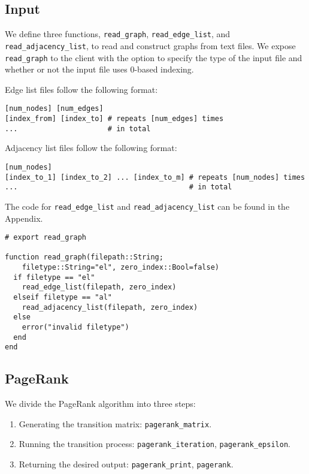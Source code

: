 \documentclass[12pt, titlepage, twoside]{amsart}
\begin{document}
\subsection{Input}

We define three functions,
\texttt{read_graph}, \texttt{read_edge_list}, and \texttt{read_adjacency_list},
to read and construct graphs from text files.
We expose \texttt{read_graph} to the client with the option to specify the type of the input file and
whether or not the input file uses 0-based indexing.

Edge list files follow the following format:

\begin{verbatim}
[num_nodes] [num_edges]
[index_from] [index_to] # repeats [num_edges] times
...                     # in total
\end{verbatim}

Adjacency list files follow the following format:

\begin{verbatim}
[num_nodes]
[index_to_1] [index_to_2] ... [index_to_m] # repeats [num_nodes] times
...                                        # in total
\end{verbatim}

The code for \texttt{read_edge_list} and \texttt{read_adjacency_list} can be found in the
Appendix.

\begin{verbatim}
# export read_graph

function read_graph(filepath::String;
    filetype::String="el", zero_index::Bool=false)
  if filetype == "el"
    read_edge_list(filepath, zero_index)
  elseif filetype == "al"
    read_adjacency_list(filepath, zero_index)
  else
    error("invalid filetype")
  end
end
\end{verbatim}

\subsection{PageRank}

We divide the PageRank algorithm into three steps:

\begin{enumerate}
  \item Generating the transition matrix: \texttt{pagerank_matrix}.
  \item Running the transition process: \texttt{pagerank_iteration}, \texttt{pagerank_epsilon}.
  \item Returning the desired output: \texttt{pagerank_print}, \texttt{pagerank}.
\end{enumerate}
\end{document}
